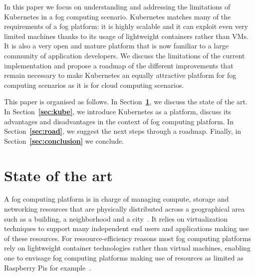 \documentclass[letterpaper,twocolumn,10pt]{article}
\let\origref\ref
\def\ref#1{\textbf{\origref{#1}}}
\begin{document}
In this paper we focus on understanding and addressing the limitations
of Kubernetes in a fog computing scenario. Kubernetes matches many of
the requirements of a fog platform: it is highly scalable and it
can exploit even very limited machines thanks to its usage of
lightweight containers rather than VMs. It is also a very open and
mature platform that is now familiar to a large community of
application developers. We discuss the limitations of the current
implementation and propose a roadmap of the different improvements
that remain necessary to make Kubernetes an equally attractive
platform for fog computing scenarios as it is for cloud computing
scenarios.




This paper is organised as follows. In Section~\ref{sec:plat}, we
discuss the state of the art. In Section~\ref{sec:kube}, we introduce
Kubernetes as a platform, discuss its advantages and disadvantages in
the context of fog computing platform. In Section~\ref{sec:road}, we
suggest the next steps through a roadmap. Finally, in
Section~\ref{sec:conclusion} we conclude.


\section{State of the art}\label{sec:plat}

A fog computing platform is in charge of managing compute, storage and
networking resources that are physically distributed across a
geographical area such as a building, a neighborhood and a
city~\cite{bonomi2014, fogecosystem}. It relies on virtualization
techniques to support many independent end users and applications
making use of these resources. For ressource-efficiency reasons most
fog computing platforms rely on lightweight container technologies
rather than virtual machines, enabling one to envisage fog computing
platforms making use of resources as limited as Raspberry Pis for
example~\cite{vankempen:hal-01446483}.
\end{document}
